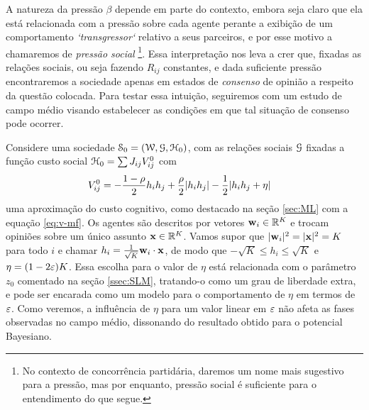 A natureza da pressão $\beta$ depende em parte do contexto, embora seja claro que ela está relacionada com a pressão sobre cada agente perante a exibição de um comportamento \emph{`transgressor`} relativo a seus parceiros, e por esse motivo a chamaremos de \emph{pressão social} \footnote{No contexto de concorrência partidária, daremos um nome mais sugestivo para a pressão, mas por enquanto, pressão social é suficiente para o entendimento do que segue.}.
Essa interpretação nos leva a crer que, fixadas as relações sociais, ou seja fazendo $R_{ij}$ constantes, e dada suficiente pressão encontraremos a sociedade apenas em estados de \emph{consenso} de opinião a respeito da questão colocada.
Para testar essa intuição, seguiremos com um estudo de campo médio visando estabelecer as condições em que tal situação de consenso pode ocorrer.

\newcommand{\qst}{\ensuremath{\vec{x}}}
\newcommand{\cutoff}{\ensuremath{\eta}}
Considere uma sociedade $\mathcal{S}_0=(\mathcal{W},\mathcal{G},{\mathcal{H}}_0)$, com as relações sociais $\mathcal{G}$ fixadas a função custo social ${\mathcal{H}}_0 = \sum J_{ij} V^0_{ij}$ com
\begin{align}\label{eq:V0ij}
  V^0_{ij} & = -\frac{1-\rho}{2}h_ih_j +\frac{\rho}{2}|h_ih_j|
               - \half|h_ih_j + \cutoff|
\end{align}
uma aproximação do custo cognitivo, como destacado na seção \ref{sec:ML} com a equação \eqref{eq:v-mf}. Os agentes são descritos por vetores $\mathbf{w}_{i}\in\mathbb{R}^K$ e trocam opiniões sobre um único assunto $\qst\in\R^K$.
Vamos supor que $|\agt{i}|^2=|\qst|^2=K$ para todo $i$ e chamar $h_i = \opn{i}{\qst}$, de modo que $-\sqrt{K} \leq h_i \leq \sqrt{K}$ e $\cutoff = (1-2\ns)K$.
Essa escolha para o valor de $\cutoff$ está relacionada com o parâmetro $z_0$ comentado na seção \ref{ssec:SLM}, tratando-o como um grau de liberdade extra, e pode ser encarada como um modelo para o comportamento de $\cutoff$ em termos de $\varepsilon$.
Como veremos, a influência de $\cutoff$ para um valor linear em $\varepsilon$ não afeta as fases observadas no campo médio, dissonando do resultado obtido para o potencial Bayesiano.

